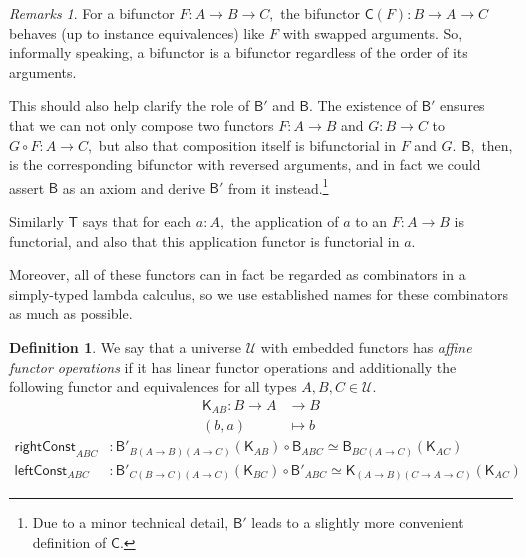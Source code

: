 \documentclass[a4paper]{article}
\theoremstyle{definition}
\newtheorem{definition}{Definition}[section]
\theoremstyle{remark}
\newtheorem*{remarks}{Remarks}
\newcommand{\defn}{\emph}
\renewcommand{\equiv}{\simeq}
\newcommand{\U}{\mathcal{U}}
\newcommand{\nm}{\mathsf}
\newcommand{\combinator}{\nm}
\newcommand{\appFun}{\combinator{T}}
\newcommand{\constFun}{\combinator{K}}
\newcommand{\compFun}{\combinator{B'}}
\newcommand{\revCompFun}{\combinator{B}}
\newcommand{\swapFun}{\combinator{C}}
\begin{document}
\begin{remarks}
  For a bifunctor $F : A \to B \to C,$ the bifunctor $\swapFun(F) : B \to A \to C$ behaves
  (up to instance equivalences) like $F$ with swapped arguments. So, informally speaking,
  a bifunctor is a bifunctor regardless of the order of its arguments.

  This should also help clarify the role of $\compFun$ and $\revCompFun.$ The existence
  of $\compFun$ ensures that we can not only compose two functors $F : A \to B$ and
  $G : B \to C$ to $G \circ F : A \to C,$ but also that composition itself is bifunctorial
  in $F$ and $G.$ $\revCompFun,$ then, is the corresponding bifunctor with reversed
  arguments, and in fact we could assert $\revCompFun$ as an axiom and derive $\compFun$
  from it instead.\footnote{Due to a minor technical detail, $\compFun$ leads to a slightly
  more convenient definition of $\swapFun.$}

  Similarly $\appFun$ says that for each $a : A,$ the application of $a$ to an
  $F : A \to B$ is functorial, and also that this application functor is functorial in
  $a.$

  Moreover, all of these functors can in fact be regarded as combinators\cite{Combinators}
  in a simply-typed lambda calculus\cite{Simply-typed lambda calculus}, so we use
  established names for these combinators as much as possible.
\end{remarks}

\vspace{1ex}
\begin{definition}
  We say that a universe $\U$ with embedded functors has \defn{affine functor
  operations} if it has linear functor operations and additionally the following functor
  and equivalences for all types $A,B,C \in \U.$
  \begin{align*}
    \constFun_{AB} : B \to A &\to     B\\
                     (b,a)   &\mapsto b
  \end{align*}
  \begin{align*}
    \nm{rightConst}_{ABC} &: \compFun_{B(A{\to}B)(A{\to}C)}(\constFun_{AB}) \circ \revCompFun_{ABC} \equiv \revCompFun_{BC(A{\to}C)}(\constFun_{AC})\\
    \nm{leftConst}_{ABC}  &: \compFun_{C(B{\to}C)(A{\to}C)}(\constFun_{BC}) \circ \compFun_{ABC} \equiv \constFun_{(A{\to}B)(C{\to}A{\to}C)}(\constFun_{AC})
  \end{align*}
\end{definition}
\end{document}
